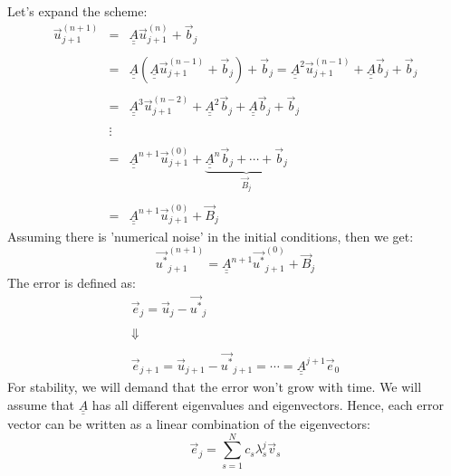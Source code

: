 \documentclass[11pt, a4paper]{article}
\begin{document}
Let's expand the scheme:
\begin{equation}
    \begin{array}{rcl}
        \vec{u}_{j+1}^{\left(n+1\right)} & = & \underline{\underline{A}}\vec{u}_{j+1}^{\left(n\right)}+\vec{b}_j \\\\
        & = & \underline{\underline{A}}\left(\underline{\underline{A}}\vec{u}_{j+1}^{\left(n-1\right)}+\vec{b}_j\right)+\vec{b}_j=\underline{\underline{A}}^2\vec{u}_{j+1}^{\left(n-1\right)}+\underline{\underline{A}}\vec{b}_j+\vec{b}_j \\\\
        & = & \underline{\underline{A}}^3\vec{u}_{j+1}^{\left(n-2\right)}+\underline{\underline{A}}^2\vec{b}_j+\underline{\underline{A}}\vec{b}_j+\vec{b}_j \\\\
        & \vdots & \\\\
        & = & \underline{\underline{A}}^{n+1}\vec{u}_{j+1}^{\left(0\right)}+\underbrace{\underline{\underline{A}}^n\vec{b}_j+\cdots+\vec{b}_j}_{\vec{B}_j} \\\\
        & = & \underline{\underline{A}}^{n+1}\vec{u}_{j+1}^{\left(0\right)}+\vec{B}_j
    \end{array}
\end{equation}
Assuming there is 'numerical noise' in the initial conditions, then we get:
\begin{equation}
    {\vec{u^*}^{\left(n+1\right)}_{j+1}}=\underline{\underline{A}}^{n+1}\vec{u^*}_{j+1}^{\left(0\right)}+\vec{B}_j
\end{equation}
The error is defined as:
\begin{equation}
    \begin{array}{c}
        \vec{e}_j=\vec{u}_j-\vec{u^*}_j \\\\
        \Downarrow \\\\
        \vec{e}_{j+1}=\vec{u}_{j+1}-\vec{u^*}_{j+1}=\cdots=\underline{\underline{A}}^{j+1}\vec{e}_0
    \end{array}
\end{equation}
For stability, we will demand that the error won't grow with time. We will assume that $\underline{\underline{A}}$ has all different eigenvalues and eigenvectors. Hence, each error vector can be written as a linear combination of the eigenvectors:
\begin{equation}
    \vec{e}_j=\sum_{s=1}^{N}c_s\lambda_s^j\vec{v}_s
\end{equation}
\end{document}
